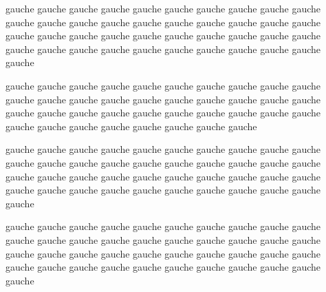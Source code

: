 \documentclass[12pt]{book}
\renewcommand{\edtext}[2]{}
\begin{document}
\begin{pages}
\begin{Leftside}
\pstart
\begin{ledgroup}
gauche gauche gauche gauche gauche gauche gauche gauche gauche gauche gauche gauche gauche gauche gauche gauche gauche gauche gauche gauche gauche gauche gauche gauche gauche gauche gauche gauche gauche gauche gauche gauche gauche gauche gauche gauche gauche gauche gauche gauche gauche\edtext{gauche}{\Afootnote{gauche gauche gauche gauche gauche gauche gauche gauche gauche gauche gauche gauche gauche gauche gauche gauche gauche gauche gauche gauche gauche gauche gauche gauche gauche gauche gauche gauche gauche gauche gauche gauche gauche gauche gauche}}

gauche gauche gauche gauche gauche gauche gauche gauche gauche gauche gauche gauche gauche gauche gauche gauche gauche gauche gauche gauche gauche gauche gauche gauche gauche gauche gauche gauche gauche gauche gauche gauche gauche gauche gauche gauche gauche gauche\edtext{gauche}{\Afootnote{gauche gauche gauche gauche gauche gauche gauche gauche gauche gauche gauche gauche gauche gauche gauche gauche gauche gauche gauche gauche gauche gauche gauche gauche gauche gauche gauche gauche gauche gauche gauche gauche gauche gauche gauche}}

gauche gauche gauche gauche gauche gauche gauche gauche gauche gauche gauche gauche gauche gauche gauche gauche gauche gauche gauche gauche gauche gauche gauche gauche gauche gauche gauche gauche gauche gauche gauche gauche gauche gauche gauche gauche gauche gauche gauche gauche gauche\edtext{gauche}{\Afootnote{gauche gauche gauche gauche gauche gauche gauche gauche gauche gauche gauche gauche gauche gauche gauche gauche gauche gauche gauche gauche gauche gauche gauche gauche gauche gauche gauche gauche gauche gauche gauche gauche gauche gauche gauche}}
\end{ledgroup}
\pend

\pstart
\begin{ledgroup}
gauche gauche gauche gauche gauche gauche gauche gauche gauche gauche gauche gauche gauche gauche gauche gauche gauche gauche gauche gauche gauche gauche gauche gauche gauche gauche gauche gauche gauche gauche gauche gauche gauche gauche gauche gauche gauche gauche gauche gauche gauche\edtext{gauche}{\Afootnote{gauche gauche gauche gauche gauche gauche gauche gauche gauche gauche gauche gauche gauche gauche gauche gauche gauche gauche gauche gauche gauche gauche gauche gauche gauche gauche gauche gauche gauche gauche gauche gauche gauche gauche gauche}}


\end{ledgroup}
\end{Leftside}
\end{pages}
\end{document}
